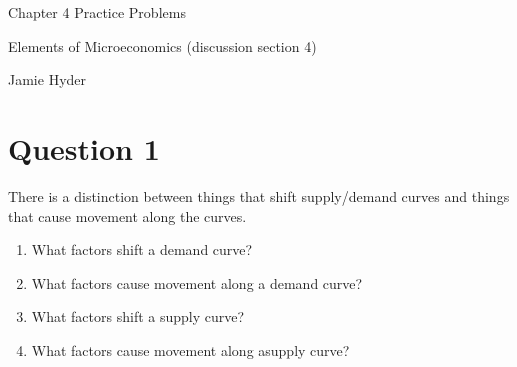 \documentclass[12pt]{article}
\begin{document}
\begin{center}
\Large Chapter 4 Practice Problems

\medskip

\normalsize Elements of Microeconomics (discussion section 4)

\medskip

\small Jamie Hyder
\end{center}

\medskip

\section*{Question 1}
There is a distinction between things that shift supply/demand curves and things that cause movement along the curves.
\begin{enumerate}
    \item What factors shift a demand curve?
    \item What factors cause movement along a demand curve?
    \item What factors shift a supply curve?
    \item What factors cause movement along asupply curve?
\end{enumerate}
\end{document}
